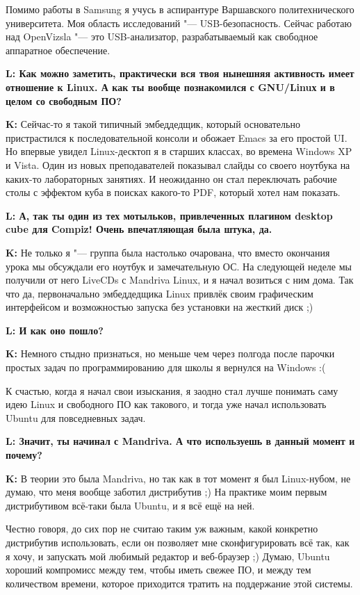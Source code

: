 \documentclass[10pt, a5paper]{article}
\begin{document}
\begin{Parallel}[p]{}{}
{Помимо работы в Samsung я учусь в аспирантуре Варшавского политехнического университета.
Моя область исследований "--- USB-безопасность. Сейчас работаю над OpenVizsla "--- это USB-анализатор, разрабатываемый как свободное аппаратное обеспечение.

{\noindent \bf L: Как можно заметить, практически вся твоя нынешняя активность имеет отношение к Linux. А как ты вообще познакомился с GNU/Linuх и в целом со свободным ПО?} 

{\noindent \bf K:}  Сейчас-то я такой типичный эмбеддедщик, который основательно пристрастился к последовательной консоли и обожает Emacs за его простой UI. Но впервые увидел Linux-десктоп я в старших классах, во времена Windows XP и Vista. Один из новых преподавателей показывал слайды со своего ноутбука на каких-то лабораторных занятиях. И неожиданно он стал переключать рабочие столы с эффектом куба в поисках какого-то PDF, который хотел нам показать.

{\noindent \bf L: А, так ты один из тех мотыльков, привлеченных плагином desktop cube для Compiz! Очень впечатляющая была штука, да.}

{\noindent \bf K:} Не только я "--- группа была настолько очарована, что вместо окончания урока мы обсуждали его ноутбук и замечательную ОС.
На следующей неделе мы получили от него LiveCDs с Mandriva Linux, и я начал возиться с ним дома.
Так что да, первоначально эмбеддедщика Linux привлёк своим графическим интерфейсом и возможностью запуска без установки на жесткий диск ;)

{\noindent \bf L: И как оно пошло?}

{\noindent \bf K:} Немного стыдно признаться, но меньше чем через полгода после парочки простых задач по программированию для школы я вернулся на Windows :(

К счастью, когда я начал свои изыскания, я заодно стал лучше понимать саму идею Linux и свободного ПО как такового, и тогда уже начал использовать Ubuntu для повседневных задач.
 
{\noindent \bf L: Значит, ты начинал с Mandriva. А что используешь в данный момент и почему?}

{\noindent \bf K:} В теории это была Mandriva, но так как в тот момент я был Linux-нубом, не думаю, что меня вообще заботил дистрибутив ;) На практике моим первым дистрибутивом всё-таки была Ubuntu, и я всё ещё на ней.

Честно говоря, до сих пор не считаю таким уж важным, какой конкретно дистрибутив использовать, если  он позволяет мне сконфигурировать всё так, как я хочу, и запускать мой любимый редактор и веб-браузер ;) Думаю, Ubuntu хороший компромисс между тем, чтобы иметь свежее ПО, и между тем количеством времени, которое приходится тратить на поддержание этой системы.

}
\end{Parallel}
\end{document}
